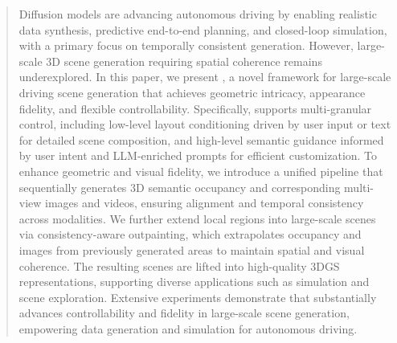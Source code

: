 \begin{abstract}
Diffusion models are advancing autonomous driving by enabling realistic data synthesis, predictive end-to-end planning, and closed-loop simulation, with a primary focus on temporally consistent generation. However, large-scale 3D scene generation requiring spatial coherence remains underexplored.
In this paper, we present \textbf{{\ours}}, a novel framework for large-scale driving scene generation that achieves geometric intricacy, appearance fidelity, and flexible controllability.
Specifically, {\method} supports multi-granular control, including low-level layout conditioning driven by user input or text for detailed scene composition, and high-level semantic guidance informed by user intent and LLM-enriched prompts for efficient customization.
To enhance geometric and visual fidelity, we introduce a unified pipeline that sequentially generates 3D semantic occupancy and corresponding multi-view images and videos, ensuring alignment and temporal consistency across modalities.
We further extend local regions into large-scale scenes via consistency-aware outpainting, which extrapolates occupancy and images from previously generated areas to maintain spatial and visual coherence.
The resulting scenes are lifted into high-quality 3DGS representations, supporting diverse applications such as simulation and scene exploration.
Extensive experiments demonstrate that {\method} substantially advances controllability and fidelity in large-scale scene generation, empowering data generation and simulation for autonomous driving.
\end{abstract}